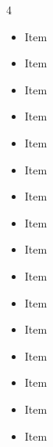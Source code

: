 \documentclass[cv01]{cv-sizuhe}
\begin{document}
\begin{multicols}{4}
    \begin{itemize}
        \item Item
        \item Item
        \item Item
        \item Item
    \end{itemize}

    \columnbreak

    \begin{itemize}
        \item Item
        \item Item
        \item Item
        \item Item
    \end{itemize}

    \columnbreak

    \begin{itemize}
        \item Item
        \item Item
        \item Item
        \item Item
    \end{itemize}

    \columnbreak

    \begin{itemize}
        \item Item
        \item Item
        \item Item
        \item Item
    \end{itemize}
\end{multicols}



    


\end{document}
